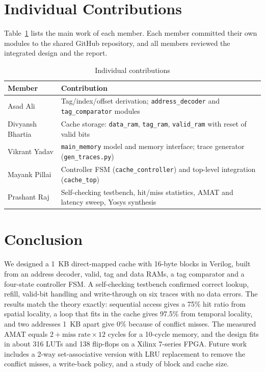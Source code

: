 \documentclass[conference]{IEEEtran}
\begin{document}
\section{Individual Contributions}
Table~\ref{tab:contrib} lists the main work of each member. Each member committed their own modules to the shared
GitHub repository, and all members reviewed the integrated design and the report.

\begin{table}[h]
\centering
\caption{Individual contributions}
\label{tab:contrib}
\begin{tabular}{>{\raggedright\arraybackslash}p{2.1cm}>{\raggedright\arraybackslash}p{5.6cm}}
\toprule
Member & Contribution \\
\midrule
Asad Ali & Tag/index/offset derivation; \texttt{address\_decoder} and \texttt{tag\_comparator} modules \\
Divyansh Bhartia & Cache storage: \texttt{data\_ram}, \texttt{tag\_ram}, \texttt{valid\_ram} with reset of valid bits \\
Vikrant Yadav & \texttt{main\_memory} model and memory interface; trace generator (\texttt{gen\_traces.py}) \\
Mayank Pillai & Controller FSM (\texttt{cache\_controller}) and top-level integration (\texttt{cache\_top}) \\
Prashant Raj & Self-checking testbench, hit/miss statistics, AMAT and latency sweep, Yosys synthesis \\
\bottomrule
\end{tabular}
\end{table}

\section{Conclusion}
We designed a 1~KB direct-mapped cache with 16-byte blocks in Verilog, built from an address decoder, valid, tag and
data RAMs, a tag comparator and a four-state controller FSM. A self-checking testbench confirmed correct lookup,
refill, valid-bit handling and write-through on six traces with no data errors. The results match the theory
exactly: sequential access gives a 75\% hit ratio from spatial locality, a loop that fits in the cache gives 97.5\%
from temporal locality, and two addresses 1~KB apart give 0\% because of conflict misses. The measured AMAT equals
$2 + \text{miss rate} \times 12$ cycles for a 10-cycle memory, and the design fits in about 316 LUTs and 138
flip-flops on a Xilinx 7-series FPGA. Future work includes a 2-way set-associative version with LRU replacement to
remove the conflict misses, a write-back policy, and a study of block and cache size.
\end{document}

